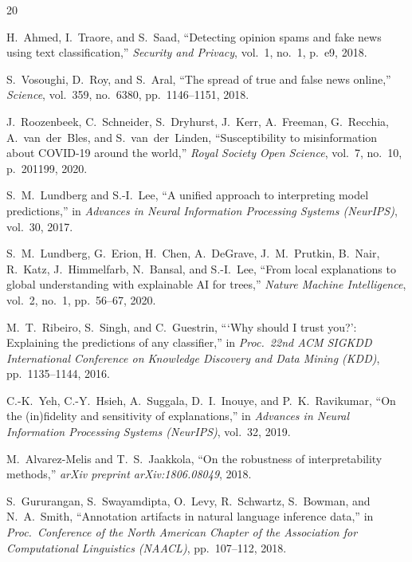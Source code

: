 \documentclass[journal,10pt,twocolumn]{IEEEtran}
\begin{document}
\balance

\begin{thebibliography}{20}

H.~Ahmed, I.~Traore, and S.~Saad,
``Detecting opinion spams and fake news using text classification,''
\emph{Security and Privacy}, vol.~1, no.~1, p.~e9, 2018.

S.~Vosoughi, D.~Roy, and S.~Aral,
``The spread of true and false news online,''
\emph{Science}, vol.~359, no.~6380, pp.~1146--1151, 2018.

J.~Roozenbeek, C.~Schneider, S.~Dryhurst, J.~Kerr, A.~Freeman,
G.~Recchia, A.~van~der~Bles, and S.~van~der~Linden,
``Susceptibility to misinformation about COVID-19 around the world,''
\emph{Royal Society Open Science}, vol.~7, no.~10, p.~201199, 2020.

S.~M.~Lundberg and S.-I.~Lee,
``A unified approach to interpreting model predictions,''
in \emph{Advances in Neural Information Processing Systems (NeurIPS)},
vol.~30, 2017.

S.~M.~Lundberg, G.~Erion, H.~Chen, A.~DeGrave, J.~M.~Prutkin, B.~Nair,
R.~Katz, J.~Himmelfarb, N.~Bansal, and S.-I.~Lee,
``From local explanations to global understanding with explainable {AI}
for trees,''
\emph{Nature Machine Intelligence}, vol.~2, no.~1, pp.~56--67, 2020.

M.~T.~Ribeiro, S.~Singh, and C.~Guestrin,
``{`Why should I trust you?'}: Explaining the predictions of any
classifier,''
in \emph{Proc.\ 22nd ACM SIGKDD International Conference on Knowledge
Discovery and Data Mining (KDD)}, pp.~1135--1144, 2016.

C.-K.~Yeh, C.-Y.~Hsieh, A.~Suggala, D.~I.~Inouye, and
P.~K.~Ravikumar,
``On the (in)fidelity and sensitivity of explanations,''
in \emph{Advances in Neural Information Processing Systems (NeurIPS)},
vol.~32, 2019.

M.~Alvarez-Melis and T.~S.~Jaakkola,
``On the robustness of interpretability methods,''
\emph{arXiv preprint arXiv:1806.08049}, 2018.

S.~Gururangan, S.~Swayamdipta, O.~Levy, R.~Schwartz, S.~Bowman, and
N.~A.~Smith,
``Annotation artifacts in natural language inference data,''
in \emph{Proc.\ Conference of the North American Chapter of the
Association for Computational Linguistics (NAACL)}, pp.~107--112, 2018.


\end{thebibliography}
\end{document}

